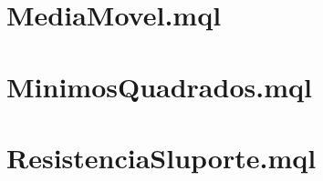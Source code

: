 \begin{apendicesenv}
\chapter{MediaMovel.mql}


\chapter{MinimosQuadrados.mql}


\chapter{ResistenciaSluporte.mql}


\end{apendicesenv}

